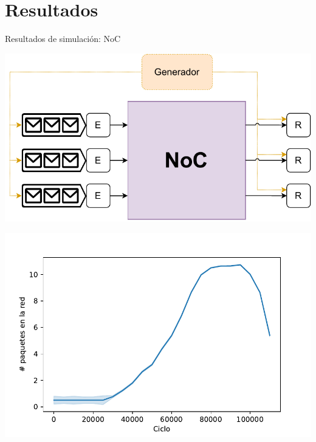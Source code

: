 \section{Resultados}

\begin{frame}{Resultados de simulación: NoC}
    \begin{minipage}{.5\textwidth}
        \centering
        \includegraphics[width=\linewidth]{Images/testbench.drawio.pdf}
    \end{minipage}\pause\begin{minipage}{.5\textwidth}
        \centering
        \includegraphics[width=\linewidth]{Images/packets.pdf}
    \end{minipage}
\end{frame}

